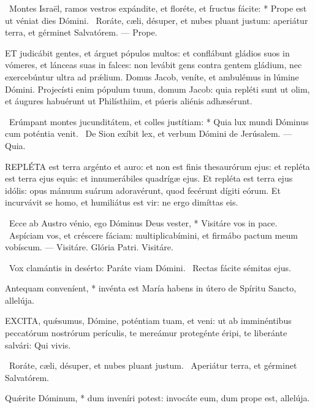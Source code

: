 \R\ Montes Israël, ramos vestros expándite, et floréte, et fructus fácite: * Prope est ut véniat dies Dómini. \V\ Roráte, cæli, désuper, et nubes pluant justum: aperiátur terra, et gérminet Salvatórem. --- Prope.


\lettrine[lines=2]{E}{T} judicábit gentes, et árguet pópulos multos: et conflábunt gládios suos in vómeres, et lánceas suas in falces: non levábit gens contra gentem gládium, nec exercebúntur ultra ad prǽlium. Domus Jacob, veníte, et ambulémus in lúmine Dómini. Projecísti enim pópulum tuum, domum Jacob: quia repléti sunt ut olim, et áugures habuérunt ut Philísthiim, et púeris aliénis adhæsérunt.

\R\ Erúmpant montes jucunditátem, et colles justítiam: * Quia lux mundi Dóminus cum poténtia venit. \V\ De Sion exíbit lex, et verbum Dómini de Jerúsalem. --- Quia.


\lettrine[lines=2]{R}{EPLÉTA} est terra argénto et auro: et non est finis thesaurórum ejus: et repléta est terra ejus equis: et innumerábiles quadrígæ ejus. Et repléta est terra ejus idólis: opus mánuum suárum adoravérunt, quod fecérunt dígiti eórum. Et incurvávit se homo, et humiliátus est vir: ne ergo dimíttas eis.

\R\ Ecce ab Austro vénio, ego Dóminus Deus vester, * Visitáre vos in pace. \V\ Aspíciam vos, et créscere fáciam: multiplicabímini, et firmábo pactum meum vobíscum. --- Visitáre. Glória Patri. Visitáre.

\V\ Vox clamántis in desérto: Paráte viam Dómini. \R\ Rectas fácite sémitas ejus.

 Antequam conveníent, * invénta est María habens in útero de Spíritu Sancto, allelúja.


\lettrine[lines=2]{E}{XCITA}, quǽsumus, Dómine, poténtiam tuam, et veni: ut ab imminéntibus peccatórum nostrórum perículis, te mereámur protegénte éripi, te liberánte salvári: Qui vivis.

\V\ Roráte, cæli, désuper, et nubes pluant justum. \R\ Aperiátur terra, et gérminet Salvatórem.

 Quǽrite Dóminum, * dum inveníri potest: invocáte eum, dum prope est, allelúja.

\sectionornament


